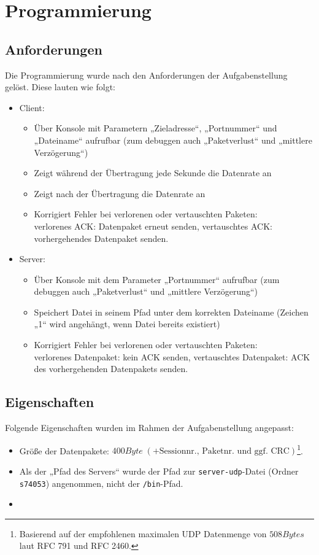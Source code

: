 \section{Programmierung}
\label{programing}

\subsection{Anforderungen}
Die Programmierung wurde nach den Anforderungen der Aufgabenstellung gelöst. Diese lauten wie folgt:
\begin{itemize}
\item Client:
\begin{itemize}
\item Über Konsole mit Parametern „Zieladresse“, „Portnummer“ und „Dateiname“ aufrufbar (zum debuggen auch „Paketverlust“ und „mittlere Verzögerung“)
\item Zeigt während der Übertragung jede Sekunde die Datenrate an
\item Zeigt nach der Übertragung die Datenrate an
\item Korrigiert Fehler bei verlorenen oder vertauschten Paketen:\\
verlorenes ACK: Datenpaket erneut senden, vertauschtes ACK: vorhergehendes Datenpaket senden.
\end{itemize}
\item Server:
\begin{itemize}
\item Über Konsole mit dem Parameter „Portnummer“ aufrufbar (zum debuggen auch „Paketverlust“ und „mittlere Verzögerung“)
\item Speichert Datei in seinem Pfad unter dem korrekten Dateiname (Zeichen „1“ wird angehängt, wenn Datei bereits existiert)
\item Korrigiert Fehler bei verlorenen oder vertauschten Paketen:\\
verlorenes Datenpaket: kein ACK senden, vertauschtes Datenpaket: ACK des vorhergehenden Datenpakets senden.
\end{itemize}
\end{itemize}
\subsection{Eigenschaften}
Folgende Eigenschaften wurden im Rahmen der Aufgabenstellung angepasst:
\begin{itemize}
\item Größe der Datenpakete: $400 \unit{Byte}\;(+\text{Sessionnr., Paketnr. und ggf. CRC})$\footnote{Basierend auf der empfohlenen maximalen UDP Datenmenge von $508\unit{Bytes}$ laut RFC 791 und RFC 2460.}.
\item Als der „Pfad des Servers“ wurde der Pfad zur \texttt{server-udp}-Datei (Ordner \texttt{s74053}) angenommen, nicht der \texttt{/bin}-Pfad.
\item 
\end{itemize}

